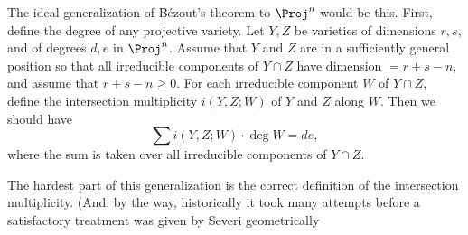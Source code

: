 {The ideal generalization of B\'ezout's theorem to $\Proj^n$ would be this. First, define the degree of any projective variety. Let $Y,Z$ be varieties of dimensions $r,s$, and of degrees $d,e$ in $\Proj^n$. Assume that $Y$ and $Z$ are in a sufficiently general position so that all irreducible components of $Y\cap Z$ have dimension $=r+s-n$, and assume that $r+s-n\geqslant0$. For each irreducible component $W$ of $Y\cap Z$, define the intersection multiplicity $i(Y,Z;W)$ of $Y$ and $Z$ along $W$. Then we should have
\[
\sum i(Y,Z;W)\cdot\deg W=de,
\]
where the sum is taken over all irreducible components of $Y\cap Z$.

The hardest part of this generalization is the correct definition of the intersection multiplicity. (And, by the way, historically it took many attempts before a satisfactory treatment was given by Severi  geometrically
}
